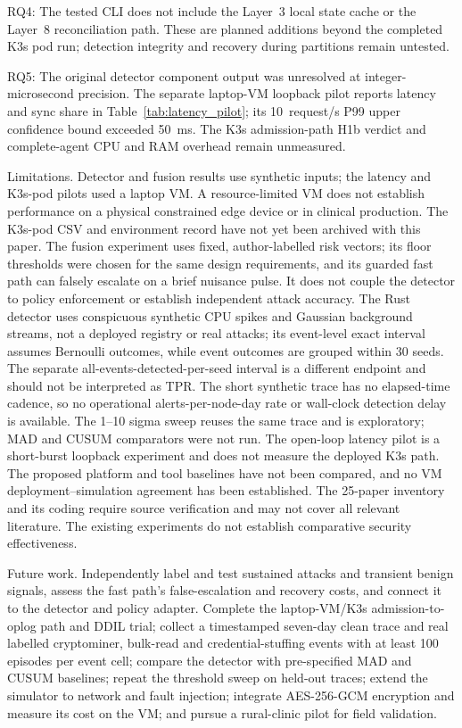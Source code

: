 \documentclass{ieeeaccess}
\renewcommand{\textbf}[1]{#1}
\begin{document}
{RQ4:} The tested CLI does not include the Layer~3 local state cache or the Layer~8 reconciliation path. These are planned additions beyond the completed K3s pod run; detection integrity and recovery during partitions remain untested.

{RQ5:} The original detector component output was unresolved at integer-microsecond precision. The separate laptop-VM loopback pilot reports latency and sync share in Table~\ref{tab:latency_pilot}; its 10~request/s P99 upper confidence bound exceeded 50~ms. The K3s admission-path H1b verdict and complete-agent CPU and RAM overhead remain unmeasured.

{Limitations.} Detector and fusion results use synthetic inputs; the latency and K3s-pod pilots used a laptop VM. A resource-limited VM does not establish performance on a physical constrained edge device or in clinical production. The K3s-pod CSV and environment record have not yet been archived with this paper. The fusion experiment uses fixed, author-labelled risk vectors; its floor thresholds were chosen for the same design requirements, and its guarded fast path can falsely escalate on a brief nuisance pulse. It does not couple the detector to policy enforcement or establish independent attack accuracy. The Rust detector uses conspicuous synthetic CPU spikes and Gaussian background streams, not a deployed registry or real attacks; its event-level exact interval assumes Bernoulli outcomes, while event outcomes are grouped within 30 seeds. The separate all-events-detected-per-seed interval is a different endpoint and should not be interpreted as TPR. The short synthetic trace has no elapsed-time cadence, so no operational alerts-per-node-day rate or wall-clock detection delay is available. The 1--10 sigma sweep reuses the same trace and is exploratory; MAD and CUSUM comparators were not run. The open-loop latency pilot is a short-burst loopback experiment and does not measure the deployed K3s path. The proposed platform and tool baselines have not been compared, and no VM deployment--simulation agreement has been established. The 25-paper inventory and its coding require source verification and may not cover all relevant literature. The existing experiments do not establish comparative security effectiveness.

\textbf{Future work.} Independently label and test sustained attacks and transient benign signals, assess the fast path's false-escalation and recovery costs, and connect it to the detector and policy adapter. Complete the laptop-VM/K3s admission-to-oplog path and DDIL trial; collect a timestamped seven-day clean trace and real labelled cryptominer, bulk-read and credential-stuffing events with at least 100 episodes per event cell; compare the detector with pre-specified MAD and CUSUM baselines; repeat the threshold sweep on held-out traces; extend the simulator to network and fault injection; integrate AES-256-GCM encryption and measure its cost on the VM; and pursue a rural-clinic pilot for field validation.
\end{document}
